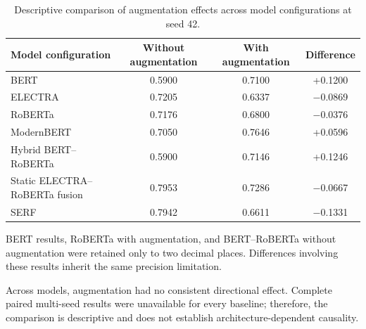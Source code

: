 \documentclass[runningheads]{llncs}
\begin{document}
\begin{table}[!h]
\caption{Descriptive comparison of augmentation effects across model configurations at seed 42.}\label{tab:augmentation-models-seed42}
\centering
\setlength{\tabcolsep}{4pt}
\scriptsize
\begin{tabularx}{\textwidth}{Yccc}
\toprule
\textbf{Model configuration} & \textbf{Without augmentation} & \textbf{With augmentation} & \textbf{Difference} \\
\midrule
BERT & 0.5900 & 0.7100 & +0.1200 \\
ELECTRA & 0.7205 & 0.6337 & \ensuremath{-}0.0869 \\
RoBERTa & 0.7176 & 0.6800 & \ensuremath{-}0.0376 \\
ModernBERT & 0.7050 & 0.7646 & +0.0596 \\
Hybrid BERT--RoBERTa & 0.5900 & 0.7146 & +0.1246 \\
Static ELECTRA--RoBERTa fusion & 0.7953 & 0.7286 & \ensuremath{-}0.0667 \\
SERF & 0.7942 & 0.6611 & \ensuremath{-}0.1331 \\
\bottomrule
\end{tabularx}
\end{table}

BERT results, RoBERTa with augmentation, and BERT--RoBERTa without augmentation were retained only to two decimal places. Differences involving these results inherit the same precision limitation.

Across models, augmentation had no consistent directional effect. Complete paired multi-seed results were unavailable for every baseline; therefore, the comparison is descriptive and does not establish architecture-dependent causality.

\nocite{tahir_cross_project_requirements,hemmat_llm_requirements}


\end{document}
